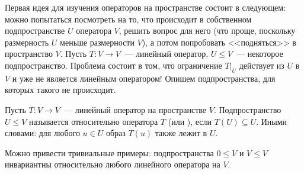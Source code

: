
Первая идея для изучения операторов на пространстве состоит
в следующем: можно попытаться посмотреть на то, что происходит
в собственном подпространстве $U$ оператора $V$, решить вопрос для него
(что проще, поскольку размерность $U$ меньше размерности $V$),
а потом попробовать <<подняться>> в пространство $V$.
Пусть $T\colon V\to V$~--- линейный оператор, $U\leq V$~--- некоторое
подпространство. Проблема состоит в том, что ограничение
$T|_U$ действует из $U$ в $V$ и уже не является линейным оператором!
Опишем подпространства, для которых такого не происходит.
\begin{definition}
Пусть $T\colon V\to V$~--- линейный оператор на пространстве $V$.
Подпространство $U\leq V$ называется  относительно
оператора $T$ (или ), если
$T(U)\subseteq U$. Иными словами: для любого $u\in U$ образ
$T(u)$ также лежит в $U$.
\end{definition}

\begin{example}
Можно привести тривиальные примеры: подпространства $0\leq V$
и $V\leq V$ инвариантны относительно любого линейного оператора
на $V$.
\end{example}

